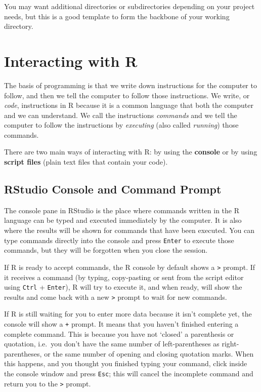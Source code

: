 \documentclass[]{book}
\theoremstyle{definition}
\theoremstyle{definition}
\theoremstyle{remark}
\begin{document}
You may want additional directories or subdirectories depending on your
project needs, but this is a good template to form the backbone of your
working directory.

\section{Interacting with R}\label{interacting-with-r}

The basis of programming is that we write down instructions for the
computer to follow, and then we tell the computer to follow those
instructions. We write, or \emph{code}, instructions in R because it is
a common language that both the computer and we can understand. We call
the instructions \emph{commands} and we tell the computer to follow the
instructions by \emph{executing} (also called \emph{running}) those
commands.

There are two main ways of interacting with R: by using the
\textbf{console} or by using \textbf{script files} (plain text files
that contain your code).

\subsection{RStudio Console and Command
Prompt}\label{rstudio-console-and-command-prompt}

The console pane in RStudio is the place where commands written in the R
language can be typed and executed immediately by the computer. It is
also where the results will be shown for commands that have been
executed. You can type commands directly into the console and press
\texttt{Enter} to execute those commands, but they will be forgotten
when you close the session.

If R is ready to accept commands, the R console by default shows a
\texttt{\textgreater{}} prompt. If it receives a command (by typing,
copy-pasting or sent from the script editor using \texttt{Ctrl} +
\texttt{Enter}), R will try to execute it, and when ready, will show the
results and come back with a new \texttt{\textgreater{}} prompt to wait
for new commands.

If R is still waiting for you to enter more data because it isn't
complete yet, the console will show a \texttt{+} prompt. It means that
you haven't finished entering a complete command. This is because you
have not `closed' a parenthesis or quotation, i.e.~you don't have the
same number of left-parentheses as right-parentheses, or the same number
of opening and closing quotation marks. When this happens, and you
thought you finished typing your command, click inside the console
window and press \texttt{Esc}; this will cancel the incomplete command
and return you to the \texttt{\textgreater{}} prompt.
\end{document}
